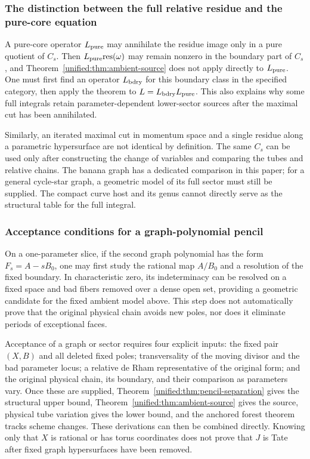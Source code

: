 \documentclass[11pt,a4paper,oneside]{article}
\theoremstyle{plain}
\theoremstyle{definition}
\theoremstyle{remark}
\numberwithin{equation}{section}
\begin{document}
\subsubsection{The distinction between the full relative residue and the pure-core equation}
A pure-core operator $L_{\rm pure}$ may annihilate the residue image only in a pure quotient of $C_s$.
Then $L_{\rm pure}\mathrm{res}(\omega)$ may remain nonzero in the boundary part of $C_s$,
and Theorem~\ref{unified:thm:ambient-source} does not apply directly to $L_{\rm pure}$.
One must first find an operator $L_{\rm bdry}$ for this boundary class in the specified category,
then apply the theorem to $L=L_{\rm bdry}L_{\rm pure}$.
This also explains why some full integrals retain parameter-dependent lower-sector sources after the maximal cut has been annihilated.

Similarly, an iterated maximal cut in momentum space and a single residue along a parametric hypersurface are not identical by definition.
The same $C_s$ can be used only after constructing the change of variables and comparing the tubes and relative chains.
The banana graph has a dedicated comparison in this paper; for a general cycle-star graph, a geometric model of its full sector must still be supplied.
The compact curve host and its genus cannot directly serve as the structural table for the full integral.

\subsubsection{Acceptance conditions for a graph-polynomial pencil}
On a one-parameter slice, if the second graph polynomial has the form $F_s=A-sB_0$,
one may first study the rational map $A/B_0$ and a resolution of the fixed boundary.
In characteristic zero, its indeterminacy can be resolved on a fixed space and bad fibers removed over a dense open set,
providing a geometric candidate for the fixed ambient model above.
This step does not automatically prove that the original physical chain avoids new poles, nor does it eliminate periods of exceptional faces.

Acceptance of a graph or sector requires four explicit inputs:
the fixed pair $(X,B)$ and all deleted fixed poles; transversality of the moving divisor and the bad parameter locus;
a relative de Rham representative of the original form; and the original physical chain, its boundary, and their comparison as parameters vary.
Once these are supplied, Theorem~\ref{unified:thm:pencil-separation} gives the structural upper bound,
Theorem~\ref{unified:thm:ambient-source} gives the source,
physical tube variation gives the lower bound, and the anchored forest theorem tracks scheme changes.
These derivations can then be combined directly.
Knowing only that $X$ is rational or has torus coordinates does not prove that $J$ is Tate after fixed graph hypersurfaces have been removed.
\end{document}
